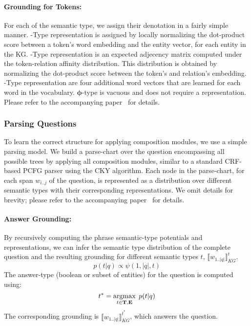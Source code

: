 \documentclass[main.tex]{subfiles}
\begin{document}
\paragraph{Grounding for Tokens:}
For each of the semantic type, we assign their denotation in a fairly simple manner.
-Type representation is assigned by locally normalizing the dot-product score between a token's word embedding and the entity vector, for each entity in the KG.
-Type representation is an expected adjecency matrix computed under the token-relation affinity distribution. This distribution is obtained by normalizing the dot-product score between the token's and relation's embedding.
-Type representation are four additional word vectors that are learned for each word in the vocabulary.
$\pmb{\phi}$-type is vacuous and does not require a representation.
Please refer to the accompanying paper~\cite{gupta-ncds-2018} for details.


\subsubsection{Parsing Questions}
\label{sssec:parse}
To learn the correct structure for applying composition modules, we use a simple parsing model. We build a parse-chart over the question encompassing all possible trees by applying all composition modules, similar to a standard CRF-based PCFG parser using the CKY algorithm.
Each node in the parse-chart, for each span $w_{i..j}$ of the question, is represented as a distribution over different semantic types with their corresponding representations. %
We omit details for brevity; please refer to the accompanying paper~\cite{gupta-ncds-2018} for details.


\paragraph{Answer Grounding:}
By recursively computing the phrase semantic-type potentials and representations, we can infer the semantic type distribution of the complete question and the resulting grounding for different semantic types $t$, $\llbracket w_{1..|q|} \rrbracket_{KG}^{t}$.
\begin{equation}
\label{eq:qtd}
    p(t|q) \propto \psi(1, |q|, t)
\end{equation}
The answer-type (boolean or subset of entities) for the question is computed using:
\begin{equation}
    t^{*} = \operatorname*{argmax}_{t \in {\textbf{T}, \textbf{E}}} \; p(t|q)
\end{equation}
The corresponding grounding is $\llbracket w_{1..|q|} \rrbracket_{KG}^{t^{*}}$, which answers the question.
\end{document}
